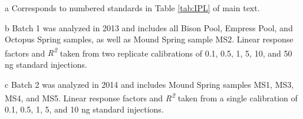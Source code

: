 {\begin{table}
\begin{threeparttable}
\begin{tablenotes}
\small
\item [a] Corresponds to numbered standards in Table \ref{tab:IPL} of main text.
\item [b] Batch 1 was analyzed in 2013 and includes all Bison Pool, Empress Pool, and Octopus Spring samples, as well as Mound Spring sample MS2. Linear response factors and \textit{R\textsuperscript{2}} taken from two replicate calibrations of 0.1, 0.5, 1, 5, 10, and 50 ng standard injections.
\item [c] Batch 2 was analyzed in 2014 and includes Mound Spring samples MS1, MS3, MS4, and MS5. Linear response factors and \textit{R\textsuperscript{2}} taken from a single calibration of 0.1, 0.5, 1, 5, and 10 ng standard injections.

\end{tablenotes}

  \label{tab:RF}
  \end{threeparttable}
\end{table}

\doublespace
\clearpage
}


